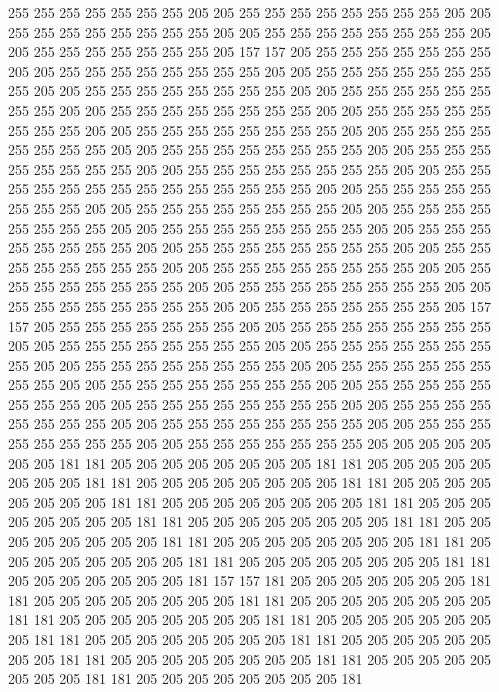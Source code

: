 255 255 255 255 255 255 255 205 205 255 255 255 255 255 255 255 255 205 205 255
255 255 255 255 255 255 255 205 205 255 255 255 255 255 255 255 255 205 205 255
255 255 255 255 255 255 205 157 157 205 255 255 255 255 255 255 255 205 205 255
255 255 255 255 255 255 255 205 205 255 255 255 255 255 255 255 255 205 205 255
255 255 255 255 255 255 255 205 205 255 255 255 255 255 255 255 255 205 205 255
255 255 255 255 255 255 255 205 205 255 255 255 255 255 255 255 255 205 205 255
255 255 255 255 255 255 255 205 205 255 255 255 255 255 255 255 255 205 205 255
255 255 255 255 255 255 255 205 205 255 255 255 255 255 255 255 255 205 205 255
255 255 255 255 255 255 255 205 205 255 255 255 255 255 255 255 255 255 255 255
255 255 255 205 205 255 255 255 255 255 255 255 255 205 205 255 255 255 255 255
255 255 255 205 205 255 255 255 255 255 255 255 255 205 205 255 255 255 255 255
255 255 255 205 205 255 255 255 255 255 255 255 255 205 205 255 255 255 255 255
255 255 255 205 205 255 255 255 255 255 255 255 255 205 205 255 255 255 255 255
255 255 255 205 205 255 255 255 255 255 255 255 255 205 205 255 255 255 255 255
255 255 255 205 205 255 255 255 255 255 255 255 255 205 205 255 255 255 255 255
255 255 205 157 157 205 255 255 255 255 255 255 255 205 205 255 255 255 255 255
255 255 255 205 205 255 255 255 255 255 255 255 255 205 205 255 255 255 255 255
255 255 255 205 205 255 255 255 255 255 255 255 255 205 205 255 255 255 255 255
255 255 255 205 205 255 255 255 255 255 255 255 255 205 205 255 255 255 255 255
255 255 255 205 205 255 255 255 255 255 255 255 255 205 205 255 255 255 255 255
255 255 255 205 205 255 255 255 255 255 255 255 255 205 205 255 255 255 255 255
255 255 255 205 205 255 255 255 255 255 255 255 205 205 205 205 205 205 205 181
181 205 205 205 205 205 205 205 205 181 181 205 205 205 205 205 205 205 205 181
181 205 205 205 205 205 205 205 205 181 181 205 205 205 205 205 205 205 205 181
181 205 205 205 205 205 205 205 205 181 181 205 205 205 205 205 205 205 205 181
181 205 205 205 205 205 205 205 205 181 181 205 205 205 205 205 205 205 205 181
181 205 205 205 205 205 205 205 205 181 181 205 205 205 205 205 205 205 205 181
181 205 205 205 205 205 205 205 205 181 181 205 205 205 205 205 205 205 181 157
157 181 205 205 205 205 205 205 205 181 181 205 205 205 205 205 205 205 205 181
181 205 205 205 205 205 205 205 205 181 181 205 205 205 205 205 205 205 205 181
181 205 205 205 205 205 205 205 205 181 181 205 205 205 205 205 205 205 205 181
181 205 205 205 205 205 205 205 205 181 181 205 205 205 205 205 205 205 205 181
181 205 205 205 205 205 205 205 205 181 181 205 205 205 205 205 205 205 205 181
